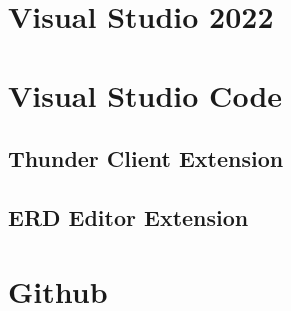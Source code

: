 \section{Visual Studio 2022}
\author{unknown}
\lipsum[10-15]

\section{Visual Studio Code}
\author{unknown}
\lipsum[10-15]

\subsection{Thunder Client Extension}
\author{Stefano Pyringer}
\lipsum[5-10]

\subsection{ERD Editor Extension}
\author{Stefano Pyringer}
\lipsum[5-10]

\section{Github}
\author{unknown}
\lipsum[10-15]